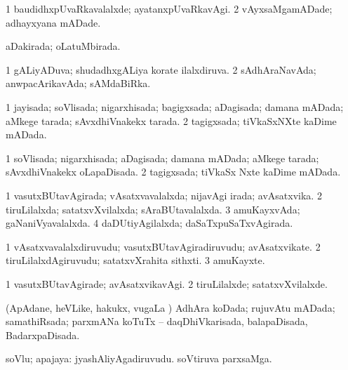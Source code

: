 \bentry
{} 
\gl{\kirxvi}
\bmng
\bnum
\num{1} baudidhxpUvaRkavalalxde; ayatanxpUvaRkavAgi. 
\num{2} vAyxsaMgamADade; adhayxyana mADade. 
\enum
\emng
\eentry

\bentry
{} 
\gl{\gu}
\expl{}
\bmng
aDakirada; oLatuMbirada. 
\emng
\eentry

\bentry
{} 
\gl{\gu}
\expl{}
\bmng
\bnum
\num{1} gALiyADuva; shudadhxgALiya korate ilalxdiruva. 
\num{2} sAdhAraNavAda; anwpacArikavAda; sAMdaBiRka. 
\enum
\emng
\eentry

\bentry
{} 
\gl{\gu}
\expl{}
\bmng
\bnum
\num{1} jayisada; soVlisada; nigarxhisada; bagigxsada; aDagisada; damana mADada; aMkege tarada; sAvxdhiVnakekx tarada. 
\num{2} tagigxsada; tiVkaSxNXte kaDime mADada. 
\enum
\emng
\eentry

\bentry
{} 
\gl{\gu}
\expl{}
\bmng
\bnum
\num{1} soVlisada; nigarxhisada; aDagisada; damana mADada; aMkege tarada; sAvxdhiVnakekx oLapaDisada. 
\num{2} tagigxsada; tiVkaSx Nxte kaDime mADada. 
\enum
\emng
\eentry

\bentry
{} 
\gl{\gu}
\expl{}
\bmng
\bnum
\num{1} vasutxBUtavAgirada; vAsatxvavalalxda; nijavAgi irada; avAsatxvika. 
\num{2} tiruLilalxda; satatxvXvilalxda; sAraBUtavalalxda. 
\num{3} amuKayxvAda; gaNaniVyavalalxda. 
\num{4} daDUtiyAgilalxda; daSaTxpuSaTxvAgirada. 
\enum
\emng
\eentry

\bentry
{} 
\gl{\nA}
\expl{}
\bmng
\bnum
\num{1} vAsatxvavalalxdiruvudu; vasutxBUtavAgiradiruvudu; avAsatxvikate. 
\num{2} tiruLilalxdAgiruvudu; satatxvXrahita sithxti. 
\num{3} amuKayxte. 
\enum
\emng
\eentry

\bentry
{} 
\gl{\kirxvi}
\expl{}
\bmng
\bnum
\num{1} vasutxBUtavAgirade; avAsatxvikavAgi. 
\num{2} tiruLilalxde; satatxvXvilalxde. 
\enum
\emng
\eentry

\bentry
{} 
\gl{\gu}
\expl{}
\bmng
(ApAdane, heVLike, hakukx, \mo vugaLa \vi) AdhAra koDada; rujuvAtu mADada; samathiRsada; parxmANa koTuTx -- daqDhiVkarisada, balapaDisada, BadarxpaDisada. 
\emng
\eentry

\bentry
{} 
\gl{\nA}
\expl{}
\bmng
soVlu; apajaya: 
\banum
{} jyashAliyAgadiruvudu. 
 soVtiruva parxsaMga. 
\eanum
\emng
\eentry

